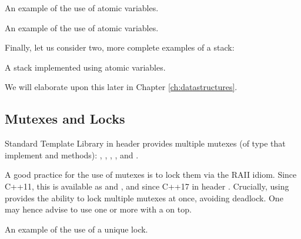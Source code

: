 \begin{itemize}
\begin{end}
\raggedbottom
\begin{codebox}[]{\href{https://godbolt.org/z/4Gjjrbjso}{\ExternalLink}}
\footnotesize An example of the use of atomic variables.
\tcblower
{}
\end{codebox}

\raggedbottom
\begin{codebox}[]{\href{https://godbolt.org/z/K4q5n3xh5}{\ExternalLink}}
\footnotesize An example of the use of atomic variables.
\tcblower
{}
\end{codebox}

Finally, let us consider two, more complete examples of a stack:

\raggedbottom
\begin{codebox}[]{\href{https://godbolt.org/z/vs5bKzjxe}{\ExternalLink}}
\footnotesize A stack implemented using atomic variables.
\tcblower
{}
\end{codebox}

We will elaborate upon this later in Chapter \ref{ch:datastructures}. 

\subsection{Mutexes and Locks}

Standard Template Library in header 	provides multiple mutexes (of type  that implement  and  methods): , , , , 
and . 

A good practice for the use of mutexes is to lock them via the RAII idiom. Since C++11, this is available as  and , and since C++17  in header .
Crucially, using  provides the ability to lock multiple mutexes at once, avoiding deadlock.
One may hence advise to use one or more  with a  on top. 

\raggedbottom
\begin{codebox}[]{\href{https://godbolt.org/z/zeM6xMz84}{\ExternalLink}}
\footnotesize An example of the use of a unique lock.
\tcblower
{}
\end{codebox}



\end{end}
\end{itemize}
